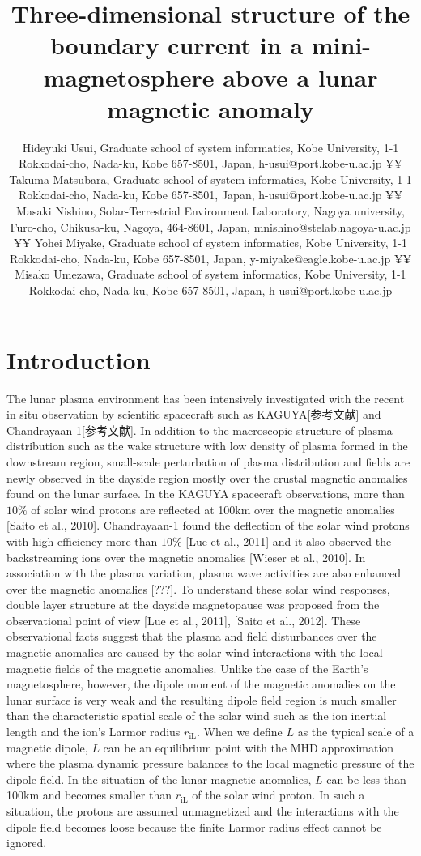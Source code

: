 \documentclass{EPS}
\title{Three-dimensional structure of the boundary current in a mini-magnetosphere above a lunar magnetic anomaly 
}
\author{
	Hideyuki Usui, 
	Graduate school of system informatics, Kobe University, 
	1-1 Rokkodai-cho, Nada-ku, Kobe 657-8501, Japan, h-usui@port.kobe-u.ac.jp ¥¥
	Takuma Matsubara, 
	Graduate school of system informatics, Kobe University, 
	1-1 Rokkodai-cho, Nada-ku, Kobe 657-8501, Japan, h-usui@port.kobe-u.ac.jp ¥¥
	Masaki Nishino, 
	Solar-Terrestrial Environment Laboratory, Nagoya university, 
	Furo-cho, Chikusa-ku, Nagoya, 464-8601, Japan, mnishino@stelab.nagoya-u.ac.jp  ¥¥
	Yohei Miyake, 
	Graduate school of system informatics, Kobe University, 
	1-1 Rokkodai-cho, Nada-ku, Kobe 657-8501, Japan, y-miyake@eagle.kobe-u.ac.jp ¥¥
	Misako Umezawa, 
	Graduate school of system informatics, Kobe University, 
	1-1 Rokkodai-cho, Nada-ku, Kobe 657-8501, Japan, h-usui@port.kobe-u.ac.jp
}
\begin{document}
\maketitle

\section{Introduction}
The lunar plasma environment has been intensively investigated with the recent in situ observation 
by scientific spacecraft such as KAGUYA[参考文献] and Chandrayaan-1[参考文献]. 
In addition to the macroscopic structure of plasma distribution such as the wake structure 
with low density of plasma formed in the downstream region, small-scale perturbation of 
plasma distribution and fields are newly observed in the dayside region mostly 
over the crustal magnetic anomalies found on the lunar surface. 
In the KAGUYA spacecraft observations, more than $10 \%$ of solar wind protons are reflected 
at 100km over the magnetic anomalies [Saito et al., 2010]. 
Chandrayaan-1 found the deflection of the solar wind protons with high efficiency more than $ 10 \%$ [Lue et al., 2011]  
and it also observed the backstreaming ions over the magnetic anomalies [Wieser et al., 2010]. 
In association with the plasma variation, plasma wave activities are also enhanced over 
the magnetic anomalies [???].
To understand these solar wind responses, double layer structure at the dayside magnetopause was 
proposed from the observational point of view [Lue et al., 2011], [Saito et al., 2012]. 
These observational facts suggest that the plasma and field disturbances over 
the magnetic anomalies are caused by the solar wind interactions with the local magnetic fields of the magnetic anomalies. 
Unlike the case of the Earth’s magnetosphere, however, the dipole moment of 
the magnetic anomalies on the lunar surface is very weak and the resulting dipole field region 
is much smaller than the characteristic spatial scale of the solar wind such as 
the ion inertial length and the ion's Larmor radius $r_\mathrm{iL}$. 
When we define $L$ as the typical scale of a magnetic dipole, 
$L$ can be an equilibrium point with the MHD approximation where the plasma dynamic pressure balances 
to the local magnetic pressure of the dipole field. 
In the situation of the lunar magnetic anomalies, $L$ can be less than 100km and 
becomes smaller than $r_\mathrm{iL}$ of the solar wind proton. 
In such a situation, the protons are assumed unmagnetized and the interactions with the dipole field becomes 
loose because the finite Larmor radius effect cannot be ignored. 
\end{document}
